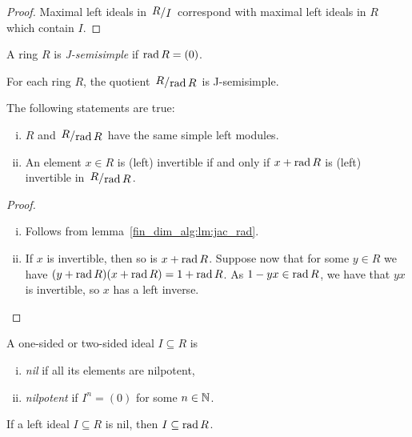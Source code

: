 \begin{proof}
Maximal left ideals in $\kvoc{R}{I}$ correspond with maximal left
ideals in $R$ which contain $I$.
\end{proof}

\begin{definicija}
A ring $R$ is \emph{J-semisimple} if
$\operatorname{rad} R = (0)$.
\end{definicija}

\begin{opomba}
For each ring $R$, the quotient $\kvoc{R}{\rad R}$ is J-semisimple.
\end{opomba}

\begin{trditev}
The following statements are true:

\begin{enumerate}[i)]
\item $R$ and $\kvoc{R}{\rad R}$ have the same simple left modules.
\item An element $x \in R$ is (left) invertible if and only if
$x + \operatorname{rad} R$ is (left) invertible in $\kvoc{R}{\rad R}$.
\end{enumerate}
\end{trditev}

\begin{proof}
\phantom{a}
\begin{enumerate}[i)]
\item Follows from lemma~\ref{fin_dim_alg:lm:jac_rad}.
\item If $x$ is invertible, then so is $x + \operatorname{rad} R$. Suppose now
that for some $y \in R$ we have
$(y + \operatorname{rad} R) (x + \operatorname{rad} R) = 1 + \operatorname{rad} R$. As $1 - yx \in \operatorname{rad} R$,
we have that $yx$ is invertible, so $x$ has a left inverse.
\qedhere
\end{enumerate}
\end{proof}

\begin{definicija}
A one-sided or two-sided ideal $I \subseteq R$ is

\begin{enumerate}[i)]
\item \emph{nil} if all its elements are
nilpotent,
\item \emph{nilpotent} if $I^n = (0)$ for
some $n \in \mathbb{N}$.
\end{enumerate}
\end{definicija}

\begin{lema}
If a left ideal $I \subseteq R$ is nil, then $I \subseteq \operatorname{rad} R$.
\end{lema}

